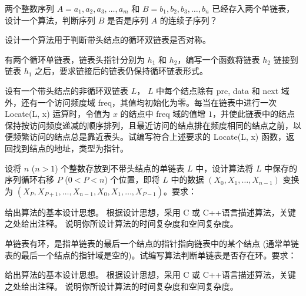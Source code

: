\begin{qitems}
    \begin{bbox}
        \qitem 两个整数序列 $A=a_1, a_2, a_3, \dots, a_m$ 和 $B=b_1, b_2, b_3, \dots, b_n$ 已经存入两个单链表，设计一个算法，判断序列 $B$ 是否是序列 $A$ 的连续子序列？
    \end{bbox}

    \begin{bbox}
        \qitem 设计一个算法用于判断带头结点的循环双链表是否对称。
    \end{bbox}

    \begin{bbox}
        \qitem 有两个循环单链表，链表头指针分别为 $h_1$ 和 $h_2$，编写一个函数将链表 $h_2$ 链接到链表 $h_1$ 之后，要求链接后的链表仍保持循环链表形式。
    \end{bbox}

    \begin{bbox}
        \qitem 设有一个带头结点的非循环双链表 $L$， $L$ 中每个结点除有 pre, data 和 next 域外，还有一个访问频度域 freq，其值均初始化为零。每当在链表中进行一次 Locate(L, x) 运算时，令值为 $x$ 的结点中 freq 域的值增 $1$，并使此链表中的结点保持按访问频度递减的顺序排列，且最近访问的结点排在频度相同的结点之前，以便频繁访问的结点总是靠近表头。试编写符合上述要求的 Locate(L, x) 函数，返回找到结点的地址，类型为指针。
    \end{bbox}

    \begin{bbox}
        \qitem 设将 $n$ ($n>1$) 个整数存放到不带头结点的单链表 $L$ 中，设计算法将 $L$ 中保存的序列循环右移 $P$ ($0<P<n$) 个位置，即将 $L$ 中的数据 $(X_0, X_1, \dots, X_{n-1})$ 变换为 $(X_P, X_{P+1}, \dots, X_{n-1}, X_0, X_1, \dots, X_{P-1})$。要求：
        \begin{subqitems}
            \subqitem 给出算法的基本设计思想。
            \subqitem 根据设计思想，采用 C 或 C++语言描述算法，关键之处给出注释。
            \subqitem 说明你所设计算法的时间复杂度和空间复杂度。
        \end{subqitems}
    \end{bbox}

    \begin{bbox}
        \qitem 单链表有环，是指单链表的最后一个结点的指针指向链表中的某个结点 (通常单链表的最后一个结点的指针域是空的)。试编写算法判断单链表是否存在环。要求：
        \begin{subqitems}
            \subqitem 给出算法的基本设计思想。
            \subqitem 根据设计思想，采用 C 或 C++语言描述算法，关键之处给出注释。
            \subqitem 说明你所设计算法的时间复杂度和空间复杂度。
        \end{subqitems}
    \end{bbox}


\end{qitems}
